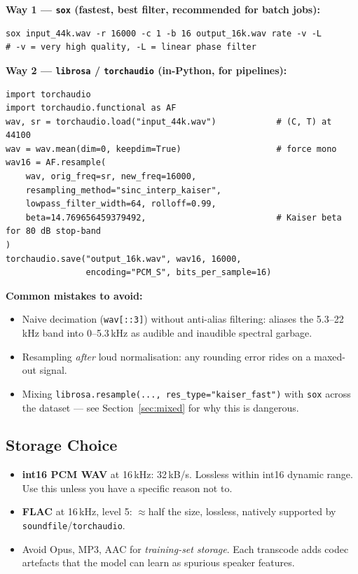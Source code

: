 \documentclass[11pt,a4paper]{article}
\begin{document}
\textbf{Way 1 --- \texttt{sox} (fastest, best filter, recommended for batch jobs):}
\begin{lstlisting}[style=bash]
sox input_44k.wav -r 16000 -c 1 -b 16 output_16k.wav rate -v -L
# -v = very high quality, -L = linear phase filter
\end{lstlisting}

\textbf{Way 2 --- \texttt{librosa} / \texttt{torchaudio} (in-Python, for pipelines):}
\begin{lstlisting}[style=python]
import torchaudio
import torchaudio.functional as AF
wav, sr = torchaudio.load("input_44k.wav")            # (C, T) at 44100
wav = wav.mean(dim=0, keepdim=True)                   # force mono
wav16 = AF.resample(
    wav, orig_freq=sr, new_freq=16000,
    resampling_method="sinc_interp_kaiser",
    lowpass_filter_width=64, rolloff=0.99,
    beta=14.769656459379492,                          # Kaiser beta for 80 dB stop-band
)
torchaudio.save("output_16k.wav", wav16, 16000,
                encoding="PCM_S", bits_per_sample=16)
\end{lstlisting}

\textbf{Common mistakes to avoid:}
\begin{itemize}
  \item Naive decimation (\texttt{wav[::3]}) without anti-alias filtering: aliases the 5.3--22\,kHz
    band into 0--5.3\,kHz as audible and inaudible spectral garbage.
  \item Resampling \emph{after} loud normalisation: any rounding error rides on a maxed-out signal.
  \item Mixing \texttt{librosa.resample(..., res\_type="kaiser\_fast")} with \texttt{sox} across the
    dataset --- see Section~\ref{sec:mixed} for why this is dangerous.
\end{itemize}

\subsection{Storage Choice}

\begin{itemize}
  \item \textbf{int16 PCM WAV} at 16\,kHz: 32\,kB/s. Lossless within int16 dynamic range. Use this
    unless you have a specific reason not to.
  \item \textbf{FLAC} at 16\,kHz, level 5: $\approx$half the size, lossless, natively supported by
    \texttt{soundfile}/\texttt{torchaudio}.
  \item Avoid Opus, MP3, AAC for \emph{training-set storage}. Each transcode adds codec artefacts
    that the model can learn as spurious speaker features.
\end{itemize}
\end{document}
